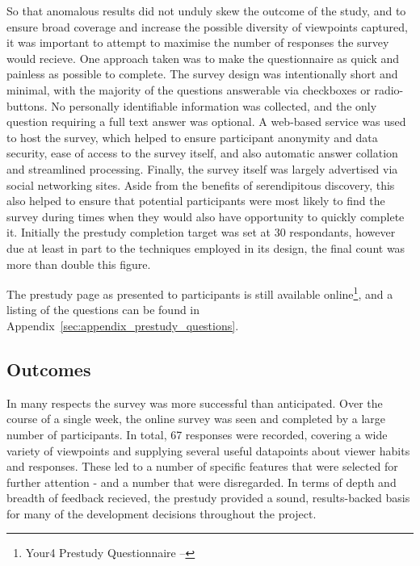 So that anomalous results did not unduly skew the outcome of the study, and to ensure broad coverage and increase the possible diversity of viewpoints captured, it was important to attempt to maximise the number of responses the survey would recieve.
One approach taken was to make the questionnaire as quick and painless as possible to complete.
The survey design was intentionally short and minimal, with the majority of the questions answerable via checkboxes or radio-buttons.
No personally identifiable information was collected, and the only question requiring a full text answer was optional. %
A web-based service was used to host the survey, which helped to ensure participant anonymity and data security, ease of access to the survey itself, and also automatic answer collation and streamlined processing.
Finally, the survey itself was largely advertised via social networking sites. Aside from the benefits of serendipitous discovery, this also helped to ensure that potential participants were most likely to find the survey during times when they would also have opportunity to quickly complete it.
Initially the prestudy completion target was set at 30 respondants, however due at least in part to the techniques employed in its design, the final count was more than double this figure. %


The prestudy page as presented to participants is still available online\footnote{Your4 Prestudy Questionnaire -- }, and a listing of the questions can be found in Appendix~\ref{sec:appendix_prestudy_questions}. 


\subsection{Outcomes}

In many respects the survey was more successful than anticipated.
Over the course of a single week, the online survey was seen and completed by a large number of participants.
In total, 67 responses were recorded, covering a wide variety of viewpoints and supplying several useful datapoints about viewer habits and responses.
These led to a number of specific features that were selected for further attention - and a number that were disregarded.
In terms of depth and breadth of feedback recieved, the prestudy provided a sound, results-backed basis for many of the development decisions throughout the project.

